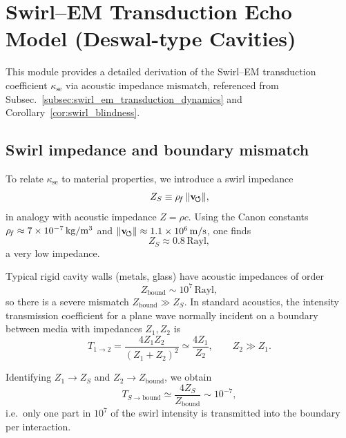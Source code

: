 \section{Swirl--EM Transduction Echo Model (Deswal-type Cavities)}
\label{app:swirl_em_transduction_impedance}

This module provides a detailed derivation of the Swirl--EM transduction
coefficient $\kappa_{\text{se}}$ via acoustic impedance mismatch, referenced
from Subsec.~\ref{subsec:swirl_em_transduction_dynamics} and Corollary~\ref{cor:swirl_blindness}.

\subsection{Swirl impedance and boundary mismatch}

    To relate $\kappa_{\text{se}}$ to material properties, we introduce a swirl
    impedance
    \begin{equation}
        Z_S
        \equiv
        \rho_{\!f} \,\lVert\mathbf{v}_{\!\boldsymbol{\circlearrowleft}}\rVert,
        \label{eq:swirl_impedance}
    \end{equation}
    in analogy with acoustic impedance $Z = \rho c$.\cite{KinslerAcoustics}
    Using the Canon constants $\rho_{\!f} \approx 7\times 10^{-7}\,\mathrm{kg/m^3}$
    and $\lVert\mathbf{v}_{\!\boldsymbol{\circlearrowleft}}\rVert \approx 1.1\times 10^{6}\,\mathrm{m/s}$, one finds
    \begin{equation}
        Z_S \approx 0.8\,\mathrm{Rayl},
        \label{eq:Zs_numeric}
    \end{equation}
    a very low impedance.

    Typical rigid cavity walls (metals, glass) have acoustic impedances of order
    \begin{equation}
        Z_{\mathrm{bound}}
        \sim 10^{7}\,\mathrm{Rayl},
    \end{equation}
    so there is a severe mismatch $Z_{\mathrm{bound}} \gg Z_S$. In standard
    acoustics, the intensity transmission coefficient for a plane wave normally
    incident on a boundary between media with impedances $Z_1, Z_2$ is
    \begin{equation}
        T_{1\to 2}
        =
        \frac{4 Z_1 Z_2}{(Z_1 + Z_2)^2}
        \simeq
        \frac{4 Z_1}{Z_2},
        \qquad Z_2 \gg Z_1.
        \label{eq:acoustic_transmission}
    \end{equation}

    Identifying $Z_1 \to Z_S$ and $Z_2 \to Z_{\mathrm{bound}}$, we obtain
    \begin{equation}
        T_{S\to \mathrm{bound}}
        \simeq
        \frac{4 Z_S}{Z_{\mathrm{bound}}}
        \sim 10^{-7},
        \label{eq:swirl_transmission_numeric}
    \end{equation}
    i.e.\ only one part in $10^{7}$ of the swirl intensity is transmitted into
    the boundary per interaction.

